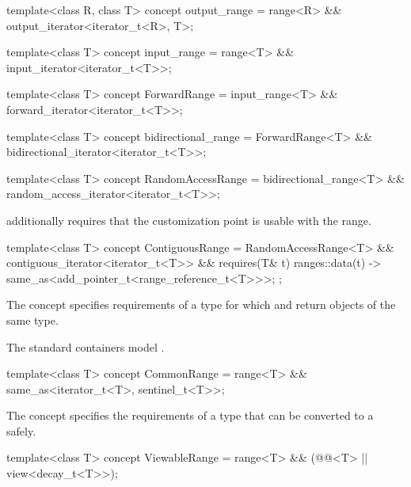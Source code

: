 %
%
%
%
%
\begin{itemdecl}
template<class R, class T>
  concept output_range =
    range<R> && output_iterator<iterator_t<R>, T>;

template<class T>
  concept input_range =
    range<T> && input_iterator<iterator_t<T>>;

template<class T>
  concept ForwardRange =
    input_range<T> && forward_iterator<iterator_t<T>>;

template<class T>
  concept bidirectional_range =
    ForwardRange<T> && bidirectional_iterator<iterator_t<T>>;

template<class T>
  concept RandomAccessRange =
    bidirectional_range<T> && random_access_iterator<iterator_t<T>>;
\end{itemdecl}

\pnum
{} additionally requires that
the  customization point
is usable with the range.

%
\begin{itemdecl}
template<class T>
  concept ContiguousRange =
    RandomAccessRange<T> && contiguous_iterator<iterator_t<T>> &&
    requires(T& t) {
      { ranges::data(t) } -> same_as<add_pointer_t<range_reference_t<T>>>;
    };
\end{itemdecl}

\pnum
The  concept specifies requirements of
a  type for which  and
 return objects of the same type.
\begin{example}
The standard containers model .
\end{example}

%
\begin{itemdecl}
template<class T>
  concept CommonRange =
    range<T> && same_as<iterator_t<T>, sentinel_t<T>>;
\end{itemdecl}

\pnum
The  concept specifies the requirements of a
 type that can be converted to a  safely.

%
\begin{itemdecl}
template<class T>
  concept ViewableRange =
    range<T> && (@@<T> || view<decay_t<T>>);
\end{itemdecl}

